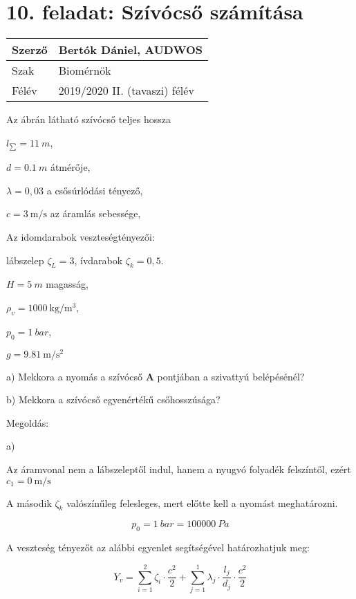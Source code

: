 \section*{10. feladat: Szívócső számítása}




\begin{tabular}{ | p{2cm} | p{14cm} | } 
	\hline
	Szerző & Bertók Dániel, AUDWOS \\ 
	\hline
	Szak & Biomérnök \\ 
	\hline
	Félév & 2019/2020 II. (tavaszi) félév \\ 
	\hline
\end{tabular}
\vspace{0.5cm}


\noindent Az ábrán látható szívócső teljes hossza

$l_\sum= \SI{11}{m}$,

$d= \SI{0,1}{m}$ átmérője,

$\lambda= 0,03$ a csősúrlódási tényező,

$c= \SI{3}{\meter\per\second}$ az áramlás sebessége,

Az idomdarabok veszteségtényezői:

lábszelep $\zeta_L= 3$, ívdarabok $\zeta_k= 0,5$.

$H= \SI{5}{m}$ magasság,

$\rho_v= \SI{1000}{\kilogram\per\meter\cubed}$,

$p_0= \SI{1}{bar}$,

$g= \SI{9,81}{\meter\per\second\squared}$ 

\noindent a) Mekkora a nyomás a szívócső \textbf{A} pontjában a szivattyú belépésénél?

\noindent b) Mekkora a szívócső egyenértékű csőhosszúsága?




\noindent\hrulefill


\noindent Megoldás:

\noindent a)

\noindent Az áramvonal nem a lábszeleptől indul, hanem a nyugvó folyadék felszíntől, ezért $c_1= \SI{0}{\meter\per\second}$

\noindent A második  $\zeta_k$ valószínűleg felesleges, mert előtte kell a nyomást meghatározni.

\begin{equation}
p_0=\SI{1}{bar}=\SI{100000}{Pa}
\end{equation}

A veszteség tényezőt az alábbi egyenlet segítségével határozhatjuk meg:

\begin{equation}
Y_v=\sum_{i=1}^2\zeta_i\cdot{\frac{c^2}{2}}+\sum_{j=1}^1\lambda_j\cdot{\frac{l_j}{d_j}}\cdot{\frac{c^2}{2}}
\end{equation}





